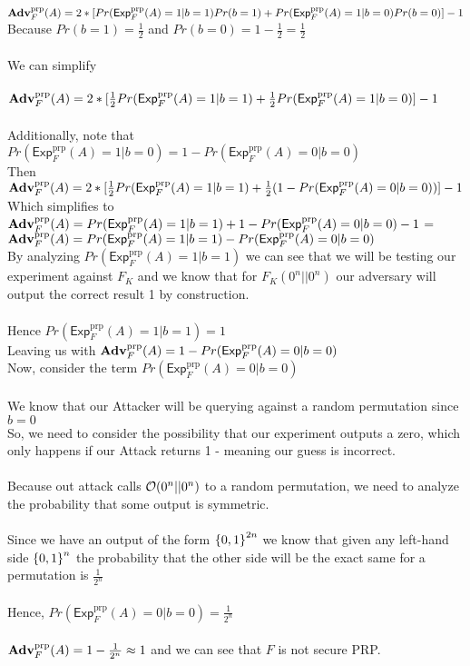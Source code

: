 \documentclass[11pt]{article}
\newcommand{\ExpPRP}[2]{\mathsf{Exp}^{\mathrm{prp}}_{#1}{(#2)}}
\newcommand{\AdvPRP}[2]{\Adv^{\mathrm{prp}}_{#1}(#2)}
\begin{document}
$\AdvPRP{F}{A} = 2*[Pr(\ExpPRP{F}{A} = 1 | b = 1)Pr(b = 1) +  Pr(\ExpPRP{F}{A} = 1 | b = 0)Pr(b = 0)] - 1$\\

Because $Pr(b = 1) = \frac{1}{2}$ and $Pr(b = 0) = 1 - \frac{1}{2} = \frac{1}{2}$ \\
\\
We can simplify \\
\\
$\AdvPRP{F}{A} = 2*[\frac{1}{2}Pr(\ExpPRP{F}{A} = 1 | b = 1) +  \frac{1}{2}Pr(\ExpPRP{F}{A} = 1 | b = 0)] - 1$\\
\\
Additionally, note that $Pr(\ExpPRP{F}{A} = 1 | b = 0) = 1 - Pr(\ExpPRP{F}{A} = 0 | b = 0)$\\


Then $\AdvPRP{F}{A} = 2*[\frac{1}{2}Pr(\ExpPRP{F}{A} = 1 | b = 1) +  \frac{1}{2}(1 - Pr(\ExpPRP{F}{A} = 0 | b = 0))] - 1$\\

Which simplifies to $\AdvPRP{F}{A} = Pr(\ExpPRP{F}{A} = 1 | b = 1) +  1 - Pr(\ExpPRP{F}{A} = 0 | b = 0) - 1$ = \\

$\AdvPRP{F}{A} = Pr(\ExpPRP{F}{A} = 1 | b = 1) - Pr(\ExpPRP{F}{A} = 0 | b = 0)$\\

By analyzing $Pr(\ExpPRP{F}{A} = 1 | b = 1)$ we can see that we will be testing our experiment against $F_K$ and we know that for $F_K(0^n|| 0^n)$ our adversary will output the correct result 1 by construction.\\ 
\\
Hence $Pr(\ExpPRP{F}{A} = 1 | b = 1) = 1$\\

Leaving us with $\AdvPRP{F}{A} = 1 - Pr(\ExpPRP{F}{A} = 0 | b = 0)$\\

Now, consider the term $Pr(\ExpPRP{F}{A} = 0 | b = 0)$\\
\\
We know that our Attacker will be querying against a random permutation since $b = 0$
\\

So, we need to consider the possibility that our experiment outputs a zero, which only happens if our Attack returns 1 - meaning our guess is incorrect. \\
\\
Because out attack calls ${\cal O}(0^n || 0^n)$ to a random permutation, we need to analyze the probability that some output is symmetric.\\
\\
Since we have an output of the form ${\{0,1\}}^{2n}$ we know that given any left-hand side ${\{0,1\}}^{n}$ the probability that the other side will be the exact same for a permutation is $\frac{1}{2^n}$\\
\\
Hence, $Pr(\ExpPRP{F}{A} = 0 | b = 0) = \frac{1}{2^n}$\\
\\
$\AdvPRP{F}{A} = 1 - \frac{1}{2^n} \approx 1$ and we can see that $F$ is not secure PRP.
\end{document}

